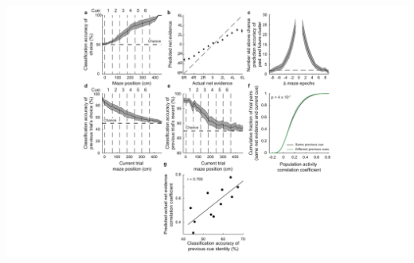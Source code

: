 \begin{FPfigure}
\includegraphics[width=1.6\textwidth,center]{figures/fig_3_16.pdf}
\caption[Main results re-analyzed using $\Delta$F/F values.]
{\textbf{Main results re-analyzed using $\Delta$F/F values. a,} Classification accuracy for choice as a function of maze position (SVM, radial basis function kernel). Independent classifiers were trained and tested at each maze position. Error bars represent mean $\pm$ s.e.m. across datasets. Compare to Figure \ref{fig:3_3}e. 
%
\textbf{b,} Actual net evidence vs. net evidence predicted by a SVR classifier. Error bars represent mean $\pm$ s.e.m. across datasets. Compare to Figure \ref{fig:3_3}f. 
%
\textbf{c,} For a given trial based on the current epoch's cluster identity, the accuracy of predicting the clusters occupied by that trial in the past and future epochs, compared to shuffled assignments of trials to clusters. Error bars represent mean $\pm$ s.e.m. across datasets. Compare to Figure \ref{fig:3_9}e. 
%
\textbf{d-e,} Classification accuracy as in (\textbf{a}), but for previous trial's choice and for whether the previous trial was rewarded (\textbf{e}). Compare to Figure \ref{fig:3_12}b-c. 
%
\textbf{f,} Cumulative distribution of the pairwise trial-trial population activity correlation coefficients for trials with the same (black) or different (green) previous cues given the same maze epoch and same net evidence (p < 4 x 10-7, two-sample KS test). Compare to Figure \ref{fig:3_15}a. 
%
\textbf{g,} Relationship between classification accuracy of the previous cue and the classification accuracy of net evidence across datasets (r = 0.76, p < 0.001). Compare to Figure \ref{fig:3_15}b.
\label{fig:3_16}}
\end{FPfigure}
\clearpage


